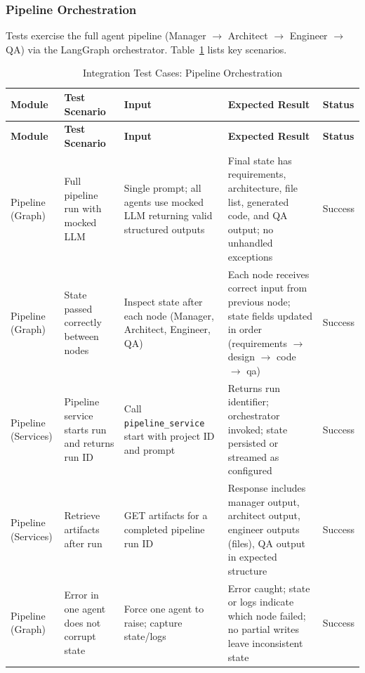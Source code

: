\subsubsection*{Pipeline Orchestration}
Tests exercise the full agent pipeline (Manager $\rightarrow$ Architect $\rightarrow$ Engineer $\rightarrow$ QA) via the LangGraph orchestrator. Table~\ref{tab:integration_pipeline} lists key scenarios.

\renewcommand{\arraystretch}{1.2}
\begin{longtable}{|p{2.8cm}|p{3.4cm}|p{3.4cm}|p{4.2cm}|>{\centering\arraybackslash}p{1.6cm}|}
\caption{Integration Test Cases: Pipeline Orchestration}
\label{tab:integration_pipeline}
\\
\hline
\textbf{Module} & \textbf{Test Scenario} & \textbf{Input} & \textbf{Expected Result} & \textbf{Status} \\
\hline
\endfirsthead
\hline
\textbf{Module} & \textbf{Test Scenario} & \textbf{Input} & \textbf{Expected Result} & \textbf{Status} \\
\hline
\endhead
\hline
\endfoot
\hline
\endlastfoot
Pipeline (Graph) & Full pipeline run with mocked LLM & Single prompt; all agents use mocked LLM returning valid structured outputs & Final state has requirements, architecture, file list, generated code, and QA output; no unhandled exceptions & Success \\
\hline
Pipeline (Graph) & State passed correctly between nodes & Inspect state after each node (Manager, Architect, Engineer, QA) & Each node receives correct input from previous node; state fields updated in order (requirements $\rightarrow$ design $\rightarrow$ code $\rightarrow$ qa) & Success \\
\hline
Pipeline (Services) & Pipeline service starts run and returns run ID & Call \texttt{pipeline\_\allowbreak{}service} start with project ID and prompt & Returns run identifier; orchestrator invoked; state persisted or streamed as configured & Success \\
\hline
Pipeline (Services) & Retrieve artifacts after run & GET artifacts for a completed pipeline run ID & Response includes manager output, architect output, engineer outputs (files), QA output in expected structure & Success \\
\hline
Pipeline (Graph) & Error in one agent does not corrupt state & Force one agent to raise; capture state/logs & Error caught; state or logs indicate which node failed; no partial writes leave inconsistent state & Success \\
\hline
\end{longtable}

